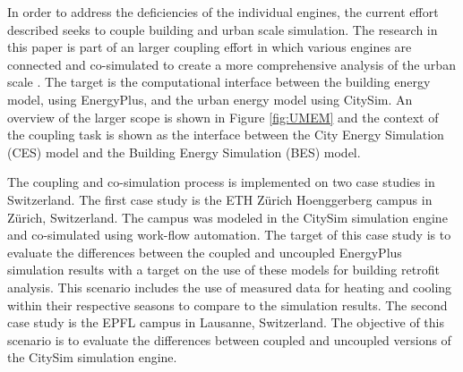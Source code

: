 \documentclass{tBPS2e}
\theoremstyle{plain}
\theoremstyle{definition}
\theoremstyle{remark}
\begin{document}
In order to address the deficiencies of the individual engines, the current effort described seeks to couple building and urban scale simulation. The research in this paper is part of an larger coupling effort in which various engines are connected and co-simulated to create a more comprehensive analysis of the urban scale \citep{Dorer:2013vt,Allegrini:2012kx}. The target is the computational interface between the building energy model, using EnergyPlus, and the urban energy model using CitySim. An overview of the larger scope is shown in Figure \ref{fig:UMEM} and the context of the coupling task is shown as the interface between the City Energy Simulation (CES) model and the Building Energy Simulation (BES) model.

The coupling and co-simulation process is implemented on two case studies in Switzerland. The first case study is the ETH Z\"urich Hoenggerberg campus in Z\"urich, Switzerland. The campus was modeled in the CitySim simulation engine and co-simulated using work-flow automation. The target of this case study is to evaluate the differences between the coupled and uncoupled EnergyPlus simulation results with a target on the use of these models for building retrofit analysis. This scenario includes the use of measured data for heating and cooling within their respective seasons to compare to the simulation results. The second case study is the EPFL campus in Lausanne, Switzerland. The objective of this scenario is to evaluate the differences between coupled and uncoupled versions of the CitySim simulation engine. 
\end{document}
